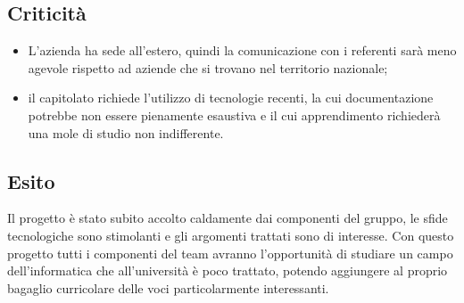 \subsection{Criticità}
	\begin{itemize}
		\item L'azienda ha sede all'estero, quindi la comunicazione con i referenti sarà meno agevole rispetto ad aziende che si trovano nel territorio nazionale; 
		\item il capitolato richiede l'utilizzo di tecnologie recenti, la cui documentazione potrebbe non essere pienamente esaustiva e il cui apprendimento richiederà una mole di studio non indifferente. 
	\end{itemize}

\subsection{Esito}
  Il progetto è stato subito accolto caldamente dai componenti del gruppo, le sfide tecnologiche sono stimolanti e gli argomenti trattati sono di interesse. Con questo progetto tutti i componenti del team avranno l’opportunità di studiare un campo dell’informatica che all’università è poco trattato, potendo aggiungere al proprio bagaglio curricolare delle voci particolarmente interessanti.